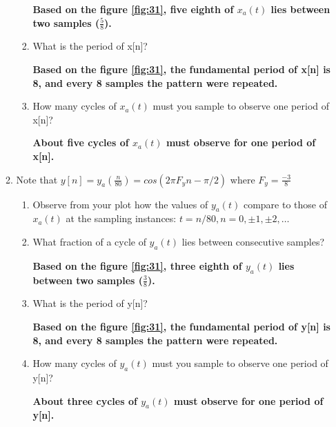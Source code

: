\documentclass[12pt]{article}
\begin{document}
\begin{enumerate}
\begin{enumerate}
\begin{enumerate}
\textbf{Based on the figure \ref{fig:31}, five eighth of $x_a(t)$ lies between two samples ($\frac{5}{8}$).}



\item What is the period of x[n]?

\textbf{Based on the figure \ref{fig:31}, the fundamental period of x[n] is 8, and every 8 samples the pattern were repeated.}




\item How many cycles of $x_a(t)$ must you sample to observe one period of x[n]?


\textbf{About five cycles of $x_a(t)$ must observe for one period of x[n].}

\end{enumerate}








\item Note that $y[n] = y_a(\frac{n}{80}) = cos(2\pi F_y n-\pi/2)$ where $F_y = \frac{-3}{8}$
\begin{enumerate}

\item Observe from your plot how the values of $y_a(t)$ compare to those of $x_a(t)$ at the sampling instances: $t = n/80, n = 0, \pm 1, \pm 2, \hdots$
\item What fraction of a cycle of $y_a(t)$ lies between consecutive samples?

\textbf{Based on the figure \ref{fig:31}, three eighth of $y_a(t)$ lies between two samples ($\frac{3}{8}$).}

\item What is the period of y[n]?

\textbf{Based on the figure \ref{fig:31}, the fundamental period of y[n] is 8, and every 8 samples the pattern were repeated.}

\item How many cycles of $y_a(t)$ must you sample to observe one period of y[n]?

\textbf{About three cycles of $y_a(t)$ must observe for one period of y[n].}

\end{enumerate}














\end{enumerate}
\end{enumerate}
\end{document}
